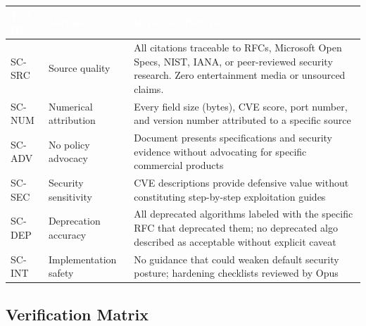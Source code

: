 \documentclass[11pt,letterpaper]{article}
\newcommand{\tableheader}[1]{\textbf{\sffamily\textcolor{white}{#1}}}
\begin{document}
\begin{center}
\begin{tabularx}{\textwidth}{L{2cm}L{4.5cm}X}
\toprule
{}
\tableheader{Test ID} & \tableheader{Verifies} & \tableheader{Expected Behavior} \\
\midrule
SC-SRC & Source quality & All citations traceable to RFCs, Microsoft Open Specs, NIST, IANA, or peer-reviewed security research. Zero entertainment media or unsourced claims. \\
SC-NUM & Numerical attribution & Every field size (bytes), CVE score, port number, and version number attributed to a specific source \\
SC-ADV & No policy advocacy & Document presents specifications and security evidence without advocating for specific commercial products \\
SC-SEC & Security sensitivity & CVE descriptions provide defensive value without constituting step-by-step exploitation guides \\
SC-DEP & Deprecation accuracy & All deprecated algorithms labeled with the specific RFC that deprecated them; no deprecated algo described as acceptable without explicit caveat \\
SC-INT & Implementation safety & No guidance that could weaken default security posture; hardening checklists reviewed by Opus \\
\bottomrule
\end{tabularx}
\end{center}

\subsection{Verification Matrix}
\end{document}

